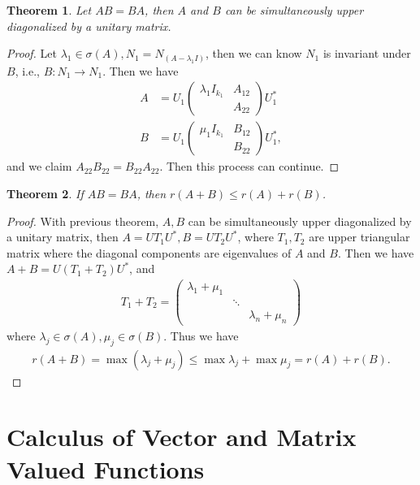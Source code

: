 \documentclass[11pt]{book}
\newtheorem{theorem}{Theorem}[chapter]
\theoremstyle{definition}
\numberwithin{equation}{chapter}
\begin{document}
\medskip

\begin{theorem}
Let $AB = BA$, then $A$ and $B$ can be simultaneously upper diagonalized by a unitary matrix.
\end{theorem}
\begin{proof}
Let $\lambda_1\in\sigma(A), N_1 = N_{(A - \lambda_1 I)}$, then we can know $N_1$ is invariant under $B$, i.e., $B:N_1\to N_1$. Then we have 
\begin{align*}
    A & = U_1 \begin{pmatrix}
    \lambda_1 I_{k_1} & A_{12} \\
     & A_{22}
    \end{pmatrix} U_1^* \\
    B & = U_1 \begin{pmatrix}
    \mu_1 I_{k_1} & B_{12} \\
     & B_{22}
    \end{pmatrix} U_1^*,
\end{align*}
and we claim $A_{22}B_{22} = B_{22}A_{22}$. Then this process can continue.
\end{proof}

\medskip

\begin{theorem}
If $AB = BA$, then $r(A+B)\leq r(A)+r(B)$.
\end{theorem}
\begin{proof}
With previous theorem, $A,B$ can be simultaneously upper diagonalized by a unitary matrix, then $A = UT_1U^*, B = UT_2U^*$, where $T_1, T_2$ are upper triangular matrix where the diagonal components are eigenvalues of $A$ and $B$. Then we have $A+B = U(T_1+T_2)U^*$, and 
\begin{align*}
    T_1+T_2 = \begin{pmatrix}
    \lambda_1 + \mu_1 &  &  \\
     & \ddots &  \\
     &  & \lambda_n + \mu_n
    \end{pmatrix}
\end{align*}
where $\lambda_j\in\sigma(A), \mu_j\in\sigma(B)$. Thus we have
\begin{align*}
    r(A+B) = \max (\lambda_j + \mu_j) \leq \max \lambda_j + \max \mu_j = r(A)+r(B).
\end{align*}
\end{proof}

\medskip

\chapter{Calculus of Vector and Matrix Valued Functions}
\end{document}
